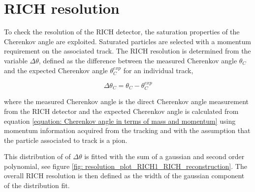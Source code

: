 \section{RICH resolution}
To check the resolution of the RICH detector, the saturation properties of the Cherenkov angle are exploited. Saturated particles are selected with a momentum requirement on the associated track. The RICH resolution is determined from the variable $\Delta\theta$, defined as the difference between the measured Cherenkov angle $\theta_C$ and the expected Cherenkov angle $\theta_C^{exp}$ for an individual track,

\begin{equation}
	\Delta \theta_{C} = \theta_{C} - \theta_C^{exp}
\end{equation}

where the measured Cherenkov angle is the direct Cherenkov angle measurement from the RICH detector and the expected Cherenkov angle is calculated from equation \ref{equation: Cherenkov angle in terms of mass and momentum} using momentum information acquired from the tracking and with the assumption that the particle associated to track is a pion.

This distribution of of $\Delta\theta$ is fitted with the sum of a gaussian and second order polynomial, see figure \ref{fig: resolution_plot_RICH1_RICH_reconstruction}. The overall RICH resolution is then defined as the width of the gaussian component of the distribution fit. 

%
%
